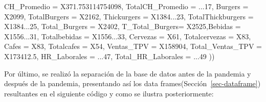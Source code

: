 \documentclass[
  us-letterpaper,
]{scrreprt}
\newenvironment{Shaded}{\begin{snugshade}}{\end{snugshade}}
\newcommand{\AttributeTok}[1]{\textcolor[rgb]{0.40,0.45,0.13}{#1}}
\newcommand{\DecValTok}[1]{\textcolor[rgb]{0.68,0.00,0.00}{#1}}
\newcommand{\FloatTok}[1]{\textcolor[rgb]{0.68,0.00,0.00}{#1}}
\newcommand{\NormalTok}[1]{\textcolor[rgb]{0.00,0.23,0.31}{#1}}
\theoremstyle{plain}
\theoremstyle{plain}
\theoremstyle{definition}
\theoremstyle{remark}
\begin{document}
\begin{Shaded}
\begin{Highlighting}[]
                  \AttributeTok{CH\_Promedio =}\NormalTok{ X371}\FloatTok{.753114754098}\NormalTok{, }
                  \AttributeTok{TotalCH\_Promedio =}\NormalTok{ ...}\DecValTok{17}\NormalTok{, }\AttributeTok{Burgers =}\NormalTok{ X2099,}
                  \AttributeTok{TotalBurgers =}\NormalTok{ X2162, }
                  \AttributeTok{Thickurgers =}\NormalTok{ X1384...}\DecValTok{23}\NormalTok{, }
                  \AttributeTok{TotalThickburgers =}\NormalTok{ X1384...}\DecValTok{25}\NormalTok{,}
                  \AttributeTok{Total\_Burgers =}\NormalTok{ X2402, }
                  \AttributeTok{T\_Total\_Burgers=}\NormalTok{ X2525,}\AttributeTok{Bebidas =}\NormalTok{ X1556...}\DecValTok{31}\NormalTok{,}
                  \AttributeTok{Totalbebidas =}\NormalTok{ X1556...}\DecValTok{33}\NormalTok{, }\AttributeTok{Cervezas =}\NormalTok{ X61,}
                  \AttributeTok{Totalcervezas =}\NormalTok{ X83, }\AttributeTok{Cafes =}\NormalTok{ X83,}
                  \AttributeTok{Totalcafes =}\NormalTok{ X54, }\AttributeTok{Ventas\_TPV =}\NormalTok{ X158904,}
                  \AttributeTok{Total\_Ventas\_TPV =}\NormalTok{ X173412}\FloatTok{.5}\NormalTok{,}
                  \AttributeTok{HR\_Laborales =}\NormalTok{ ...}\DecValTok{47}\NormalTok{,}
                  \AttributeTok{Total\_HR\_Laborales =}\NormalTok{ ...}\DecValTok{49}\NormalTok{ ))}
\end{Highlighting}
\end{Shaded}

Por último, se realizó la separación de la base de datos antes de la
pandemia y después de la pandemia, presentando así los data
frames(Sección~\ref{sec-dataframe}) resultantes en el siguiente código y
como se ilustra posteriormente:
\end{document}

